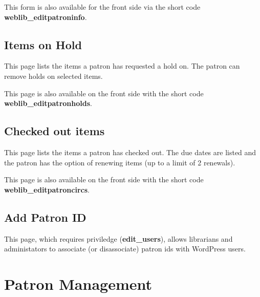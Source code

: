 \documentclass[letterpaper,twoside]{article}
\begin{document}
This form is also available for the front side via the short code
\textbf{weblib\_editpatroninfo}.

\subsection{Items on Hold}
This page lists the items a patron has requested a hold on.  The patron
can remove holds on selected items.

This page is also available on the front side with the short code 
\textbf{weblib\_editpatronholds}.

\subsection{Checked out items}
This page lists the items a patron has checked out. The due dates are
listed and the patron has the option of renewing items (up to a limit of
2 renewals).

This page is also available on the front side with the short code 
\textbf{weblib\_editpatroncircs}.

\subsection{Add Patron ID} This page, which requires priviledge
(\textbf{edit\_users}), allows librarians and administators to associate
(or disassociate) patron ids with WordPress users.

\section{Patron Management}
\end{document}

